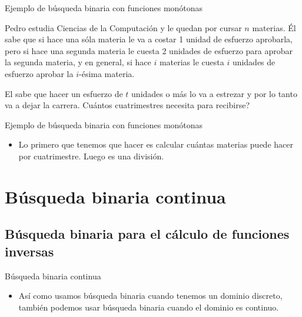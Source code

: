 \documentclass[compress]{beamer}
\begin{document}
\begin{frame}{Ejemplo de búsqueda binaria con funciones monótonas}

Pedro estudia Ciencias de la Computación y le quedan por cursar $n$ materias.
Él sabe que si hace una sóla materia le va a costar 1 unidad de esfuerzo
aprobarla, pero si hace una segunda materia le cuesta 2 unidades de esfuerzo
para aprobar la segunda materia, y en general, si hace $i$ materias le cuesta
$i$ unidades de esfuerzo aprobar la $i$-ésima materia.

El sabe que hacer un esfuerzo de $t$ unidades o más lo va a estrezar y por lo
tanto va a dejar la carrera. Cuántos cuatrimestres necesita para recibirse?

\end{frame}

\begin{frame}{Ejemplo de búsqueda binaria con funciones monótonas}

\begin{itemize}
  \item Lo primero que tenemos que hacer es calcular cuántas materias puede
        hacer por cuatrimestre. Luego es una división.\pause
\end{itemize}
\end{frame}
\section{Búsqueda binaria continua}

\subsection{Búsqueda binaria para el cálculo de funciones inversas}

\begin{frame}{Búsqueda binaria continua}
\begin{itemize}
  \item Así como usamos búsqueda binaria cuando tenemos un dominio discreto,
        también podemos usar búsqueda binaria cuando el dominio es continuo. \pause
  \pause
\end{itemize}
\end{frame}
\end{document}
